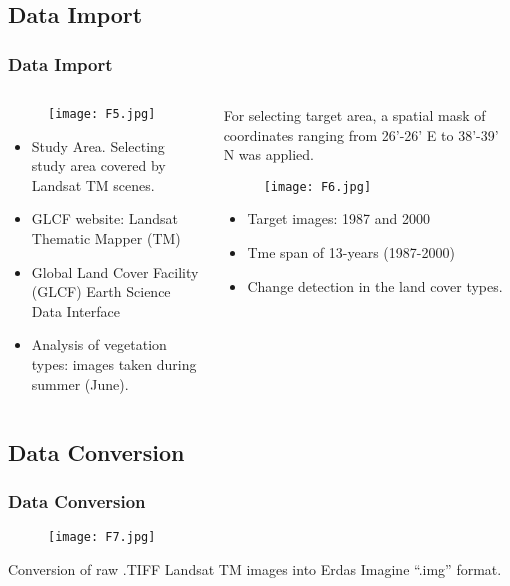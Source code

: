 \documentclass[pdflatex,compress,8pt,
	xcolor={dvipsnames,dvipsnames,svgnames,x11names,table},
	hyperref={
	breaklinks = true, 
	pdfauthor={Lemenkova Polina}, 
	pdfsubject={Preentation}, 
	pdfcreator={Lemenkova Polina}, 
	pdfproducer={Lemenkova Polina}, 
	citecolor=NavyBlue, 
	urlbordercolor=cyan,
	urlcolor = NavyBlue, 
	breaklinks = true}]{beamer}
\begin{document}
\subsection{Data Import} 
\begin{frame}\frametitle{Data Import}
\begin{minipage}[0.4\textheight]{\textwidth}
\begin{columns}[T]
\begin{column}{0.5\textwidth}
\vspace{1em}
\begin{figure}[H]
	\centering
		\texttt{[image: F5.jpg]}
\end{figure}
\begin{itemize}
	\item Study Area. Selecting study area covered by Landsat TM scenes.
 	\item GLCF website: Landsat Thematic Mapper (TM)
	\item Global Land Cover Facility (GLCF) Earth Science Data Interface
	\item Analysis of vegetation types: images taken during summer (June). 
\end{itemize}
\end{column}
\begin{column}{0.5\textwidth}
\vspace{1em} 
For selecting target area, a spatial mask of coordinates ranging from 26'-26' E to 38'-39' N was applied. 
\begin{figure}[H]
	\centering
		\texttt{[image: F6.jpg]}
\end{figure}
\begin{itemize}
	\item Target images: 1987 and 2000 
	\item Tme span of 13-years (1987-2000) 
	\item Change detection in the land cover types.
\end{itemize}
\end{column}
\end{columns}
\end{minipage}
\end{frame}

\subsection{Data Conversion}
\begin{frame}\frametitle{Data Conversion}
\begin{figure}[H]
	\centering
		\texttt{[image: F7.jpg]}
\end{figure}
Conversion of raw .TIFF Landsat TM images into Erdas Imagine “.img” format.
\end{frame}
\end{document}

